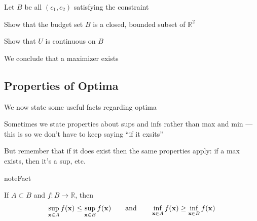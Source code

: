 \documentclass[letterpaper,10pt,english]{jupyterBook}
\begin{document}
\sphinxAtStartPar
Let \(B\) be all \((c_1, c_2)\) satisfying the constraint

\sphinxAtStartPar
{} Show that the budget set \(B\) is a closed, bounded subset of \(\mathbb{R}^2\)

\sphinxAtStartPar
{} Show that \(U\) is continuous on \(B\)

\sphinxAtStartPar
We conclude that a maximizer exists


\subsection{Properties of Optima}
\label{\detokenize{06.optimization_fundamentals:properties-of-optima}}
\sphinxAtStartPar
We now state some useful facts regarding optima

\sphinxAtStartPar
Sometimes we state properties about sups and infs rather than max and min — this is so we don’t have to keep saying “if it exsits”

\sphinxAtStartPar
But remember that if it does exist then the same properties apply: if a max exists, then it’s a sup, etc.

\begin{sphinxadmonition}{note}{Fact}

\sphinxAtStartPar
If \(A \subset B\) and \(f \colon B \to \mathbb{R}\), then
\begin{equation*}
\begin{split}
%
\sup_{{\bf x} \in A} f({\bf x}) \leq \sup_{{\bf x} \in B} f({\bf x})
\qquad \text{and} \qquad
\inf_{{\bf x} \in A} f({\bf x}) \geq \inf_{{\bf x} \in B} f({\bf x})
%
\end{split}
\end{equation*}\end{sphinxadmonition}

\begin{figure}[htbp]
\centering

\noindent{}
\end{figure}
\end{document}
